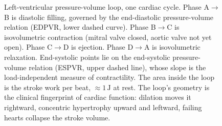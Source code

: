 \begin{figure}[htbp]
\caption{Left-ventricular pressure-volume loop, one cardiac cycle.
Phase A$\to$B is diastolic filling, governed by the end-diastolic
pressure-volume relation (EDPVR, lower dashed curve). Phase B$\to$C
is isovolumetric contraction (mitral valve closed, aortic valve not
yet open). Phase C$\to$D is ejection. Phase D$\to$A is isovolumetric
relaxation. End-systolic points lie on the end-systolic
pressure-volume relation (ESPVR, upper dashed line), whose slope is
the load-independent measure of contractility. The area inside the
loop is the stroke work per beat, $\approx 1\,\text{J}$ at rest. The
loop's geometry is the clinical fingerprint of cardiac function:
dilation moves it rightward, concentric hypertrophy upward and
leftward, failing hearts collapse the stroke volume.}
\label{fig:vol06ch06:pv-loop}
\end{figure}
